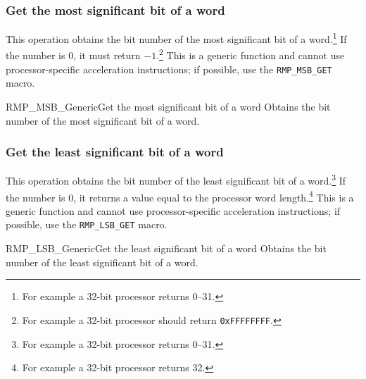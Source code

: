 \subsubsection{Get the most significant bit of a word}

This operation obtains the bit number of the most significant bit of a word.\footnote{For example a 32-bit processor returns 0--31.}
If the number is 0, it must return $-1$.\footnote{For example a 32-bit processor should return \texttt{0xFFFFFFFF}.}
This is a generic function and cannot use processor-specific acceleration instructions; if possible, use the \texttt{RMP\_MSB\_GET} macro.

\begin{apidesc}{RMP\_MSB\_Generic}{Get the most significant bit of a word}\label{api:RMP_MSB_Generic}
    Obtains the bit number of the most significant bit of a word.
    \begin{apiparams}
    \end{apiparams}
    \begin{apiret}
    \end{apiret}
\end{apidesc}

\subsubsection{Get the least significant bit of a word}

This operation obtains the bit number of the least significant bit of a word.\footnote{For example a 32-bit processor returns 0--31.}
If the number is 0, it returns a value equal to the processor word length.\footnote{For example a 32-bit processor returns 32.}
This is a generic function and cannot use processor-specific acceleration instructions; if possible, use the \texttt{RMP\_LSB\_GET} macro.

\begin{apidesc}{RMP\_LSB\_Generic}{Get the least significant bit of a word}\label{api:RMP_LSB_Generic}
    Obtains the bit number of the least significant bit of a word.
    \begin{apiparams}
    \end{apiparams}
    \begin{apiret}
    \end{apiret}
\end{apidesc}

